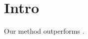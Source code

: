 \documentclass{article}
\begin{document}
\section{Intro}
Our method \cite{vaswani2017attention} outperforms \cite{he2016deep}.

\end{document}
